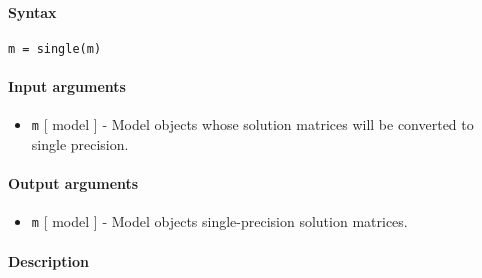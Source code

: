 


	\paragraph{Syntax}

\begin{verbatim}
m = single(m)
\end{verbatim}

\paragraph{Input arguments}

\begin{itemize}
\itemsep1pt\parskip0pt
\item
  \texttt{m} {[} model {]} - Model objects whose solution matrices will
  be converted to single precision.
\end{itemize}

\paragraph{Output arguments}

\begin{itemize}
\itemsep1pt\parskip0pt
\item
  \texttt{m} {[} model {]} - Model objects single-precision solution
  matrices.
\end{itemize}

\paragraph{Description}


